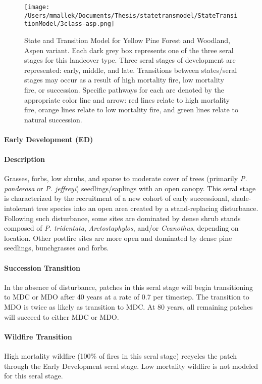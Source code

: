 \begin{figure}[htbp]
\centering
\texttt{[image: /Users/mmallek/Documents/Thesis/statetransmodel/StateTransitionModel/3class-asp.png]}
\caption{State and Transition Model for Yellow Pine Forest and Woodland, Aspen variant. Each dark grey box represents one of the three seral stages for this landcover type. Three seral stages of development are represented: early, middle, and late. Transitions between states/seral stages may occur as a result of high mortality fire, low mortality fire, or succession. Specific pathways for each are denoted by the appropriate color line and arrow: red lines relate to high mortality fire, orange lines relate to low mortality fire, and green lines relate to natural succession.} 
\label{transmodel_ypn-asp}
\end{figure}

\paragraph{Early Development (ED)}

\paragraph{Description} Grasses, forbs, low shrubs, and sparse to moderate cover of trees (primarily \emph{P. ponderosa} or \emph{P. jeffreyi}) seedlings/saplings with an open canopy. This seral stage is characterized by the recruitment of a new cohort of early successional, shade-intolerant tree species into an open area created by a stand-replacing disturbance. Following such disturbance, some sites are dominated by dense shrub stands composed of \emph{P. tridentata}, \emph{Arctostaphylos}, and/or \emph{Ceanothus}, depending on location. Other postfire sites are more open and dominated by dense pine seedlings, bunchgrasses and forbs.

\paragraph{Succession Transition} In the absence of disturbance, patches in this seral stage will begin transitioning to MDC or MDO after 40 years at a rate of 0.7 per timestep. The transition to MDO is twice as likely as transition to MDC.  At 80 years, all remaining patches will succeed to either MDC or MDO. 

\paragraph{Wildfire Transition} High mortality wildfire (100\% of fires in this seral stage) recycles the patch through the Early Development seral stage. Low mortality wildfire is not modeled for this seral stage. 

